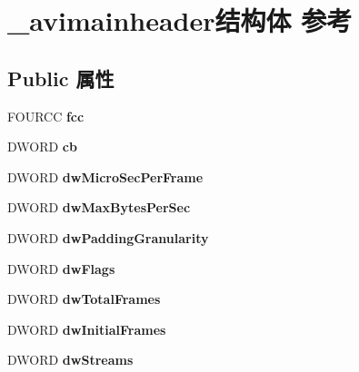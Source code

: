 \hypertarget{struct__avimainheader}{}\section{\+\_\+avimainheader结构体 参考}
\label{struct__avimainheader}
\subsection*{Public 属性}
\begin{DoxyCompactItemize}
\item 
\mbox{\label{struct__avimainheader_accdc8ea8fd2ebc464d5ee5d35e675937}} 
F\+O\+U\+R\+CC {\bfseries fcc}
\item 
\mbox{\label{struct__avimainheader_a77a40da400be297764a79342d5468c6c}} 
D\+W\+O\+RD {\bfseries cb}
\item 
\mbox{\label{struct__avimainheader_a7a7e5aa022f882a5b579846737e2b965}} 
D\+W\+O\+RD {\bfseries dw\+Micro\+Sec\+Per\+Frame}
\item 
\mbox{\label{struct__avimainheader_ada2b2620bc91a0298d2d03e8bcc0ba2e}} 
D\+W\+O\+RD {\bfseries dw\+Max\+Bytes\+Per\+Sec}
\item 
\mbox{\label{struct__avimainheader_adb2f52d60ba8d02f51ca0c00f0a5d483}} 
D\+W\+O\+RD {\bfseries dw\+Padding\+Granularity}
\item 
\mbox{\label{struct__avimainheader_aaa3c16ea6a6fa047a705269b2294a83b}} 
D\+W\+O\+RD {\bfseries dw\+Flags}
\item 
\mbox{\label{struct__avimainheader_afc32e0b2218b4b3d2b449df9d3979608}} 
D\+W\+O\+RD {\bfseries dw\+Total\+Frames}
\item 
\mbox{\label{struct__avimainheader_a8e64f69f300a7f1de2857dcd452532e8}} 
D\+W\+O\+RD {\bfseries dw\+Initial\+Frames}
\item 
\mbox{\label{struct__avimainheader_ad2d150fffdd96e8b828657fc308355fd}} 
D\+W\+O\+RD {\bfseries dw\+Streams}

\end{DoxyCompactItemize}
